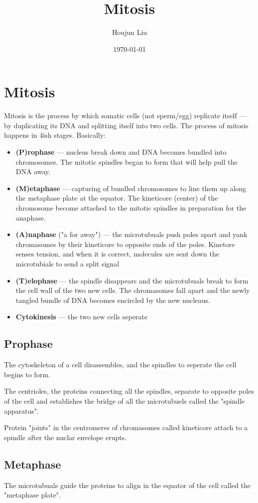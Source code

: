 \documentclass[letterpaper]{article}
\author{Houjun Liu}
\date{\today}
\title{Mitosis}
\renewcommand{\tableofcontents}{}
\begin{document}
\tableofcontents



\section{Mitosis}
\label{sec:org372103b}
Mitosis is the process by which somatic cells (not sperm/egg) replicate
itself --- by duplicating its DNA and splitting itself into two cells.
The process of mitosis happens in 4ish stages. Basically:

\begin{itemize}
\item \textbf{(P)rophase} --- nucleus break down and DNA becomes bundled into
chromosomes. The mitotic spindles began to form that will help pull
the DNA away.
\item \textbf{(M)etaphase} --- capturing of bundled chromosomes to line them up
along the metaphase plate at the equator. The kineticore (center) of
the chromosome become attached to the mitotic spindles in preparation
for the anaphase.
\item \textbf{(A)naphase} ("a for away") --- the microtubuals push poles apart and
yank chromasomes by their kineticore to opposite ends of the poles.
Kinetore senses tension, and when it is correct, molecules are sent
down the microtubials to send a split signal
\item \textbf{(T)elophase} --- the spindle disappears and the microtubuals break to
form the cell wall of the two new cells. The chromasomes fall apart
and the newly tangled bundle of DNA becomes encircled by the new
nucleaus.
\item \textbf{Cytokinesis} --- the two new cells seperate
\end{itemize}

\subsection{Prophase}
\label{sec:orgdd5ac9d}
The cytoskeleton of a cell disassembles, and the spindles to seperate
the cell begins to form.

The centrioles, the proteins connecting all the spindles, separate to
opposite poles of the cell and establishes the bridge of all the
microtubuels called the "spindle apparatus".

Protein "joints" in the centromeres of chromasomes called kineticore
attach to a spindle after the nuclar envelope erupts.

\subsection{Metaphase}
\label{sec:orgfb57140}
The microtubuals guide the proteins to align in the equator of the cell
called the "metaphase plate".
\end{document}
